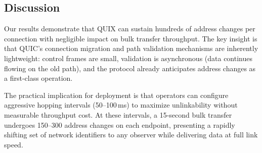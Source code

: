 \subsection{Discussion}

Our results demonstrate that QUIX can sustain hundreds of address changes per connection with negligible impact on bulk transfer throughput. The key insight is that QUIC's connection migration and path validation mechanisms are inherently lightweight: control frames are small, validation is asynchronous (data continues flowing on the old path), and the protocol already anticipates address changes as a first-class operation.

The practical implication for deployment is that operators can configure aggressive hopping intervals (50--100\,ms) to maximize unlinkability without measurable throughput cost. At these intervals, a 15-second bulk transfer undergoes 150--300 address changes on each endpoint, presenting a rapidly shifting set of network identifiers to any observer while delivering data at full link speed.

